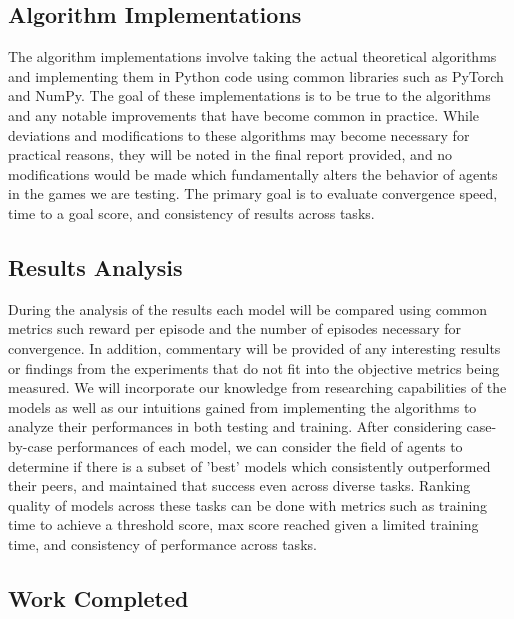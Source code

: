 \documentclass[conference]{IEEEtran}
\begin{document}
\subsection{Algorithm Implementations}
The algorithm implementations involve taking the actual theoretical algorithms and implementing them in Python code using common libraries such as PyTorch and NumPy.
The goal of these implementations is to be true to the algorithms and any notable improvements that have become common in practice.
While deviations and modifications to these algorithms may become necessary for practical reasons, they will be noted in the final report provided, and no modifications would be made which fundamentally alters the behavior of agents in the games we are testing. The primary goal is to evaluate convergence speed, time to a goal score, and consistency of results across tasks.

\subsection{Results Analysis}
During the analysis of the results each model will be compared using common metrics such reward per episode and the number of episodes necessary for convergence.
In addition, commentary will be provided of any interesting results or findings from the experiments that do not fit into the objective metrics being measured.
We will incorporate our knowledge from researching capabilities of the models as well as our intuitions gained from implementing the algorithms to analyze their performances in both testing and training. After considering case-by-case performances of each model, we can consider the field of agents to determine if there is a subset of 'best' models which consistently outperformed their peers, and maintained that success even across diverse tasks. Ranking quality of models across these tasks can be done with metrics such as training time to achieve a threshold score, max score reached given a limited training time, and consistency of performance across tasks.

\subsection{Work Completed}
\end{document}
